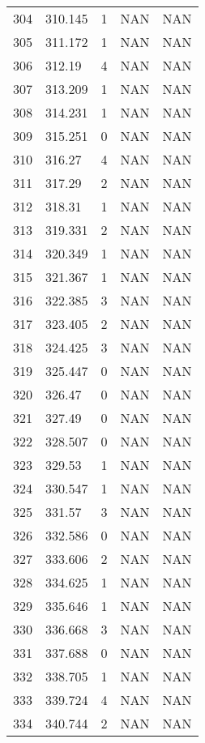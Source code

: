 \documentclass{article}
\begin{document}
\begin{longtable}{@{}lllll@{}}
				304 & 310.145 & 1     & NAN   & NAN   \\
				305 & 311.172 & 1     & NAN   & NAN   \\
				306 & 312.19  & 4     & NAN   & NAN   \\
				307 & 313.209 & 1     & NAN   & NAN   \\
				308 & 314.231 & 1     & NAN   & NAN   \\
				309 & 315.251 & 0     & NAN   & NAN   \\
				310 & 316.27  & 4     & NAN   & NAN   \\
				311 & 317.29  & 2     & NAN   & NAN   \\
				312 & 318.31  & 1     & NAN   & NAN   \\
				313 & 319.331 & 2     & NAN   & NAN   \\
				314 & 320.349 & 1     & NAN   & NAN   \\
				315 & 321.367 & 1     & NAN   & NAN   \\
				316 & 322.385 & 3     & NAN   & NAN   \\
				317 & 323.405 & 2     & NAN   & NAN   \\
				318 & 324.425 & 3     & NAN   & NAN   \\
				319 & 325.447 & 0     & NAN   & NAN   \\
				320 & 326.47  & 0     & NAN   & NAN   \\
				321 & 327.49  & 0     & NAN   & NAN   \\
				322 & 328.507 & 0     & NAN   & NAN   \\
				323 & 329.53  & 1     & NAN   & NAN   \\
				324 & 330.547 & 1     & NAN   & NAN   \\
				325 & 331.57  & 3     & NAN   & NAN   \\
				326 & 332.586 & 0     & NAN   & NAN   \\
				327 & 333.606 & 2     & NAN   & NAN   \\
				328 & 334.625 & 1     & NAN   & NAN   \\
				329 & 335.646 & 1     & NAN   & NAN   \\
				330 & 336.668 & 3     & NAN   & NAN   \\
				331 & 337.688 & 0     & NAN   & NAN   \\
				332 & 338.705 & 1     & NAN   & NAN   \\
				333 & 339.724 & 4     & NAN   & NAN   \\
				334 & 340.744 & 2     & NAN   & NAN   \\

\end{longtable}
\end{document}
